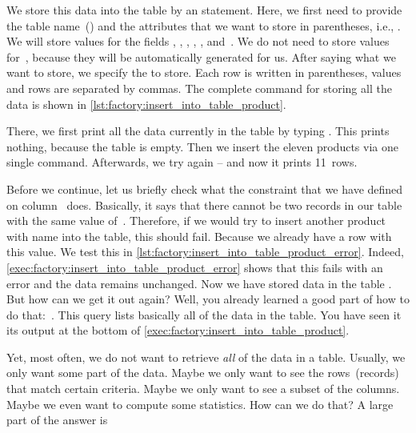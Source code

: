 We store this data into the table  by an  statement.
Here, we first need to provide the table name~() and the attributes that we want to store in parentheses, i.e., .
We will store values for the fields , , , , , and~.
We do not need to store values for~, because they will be automatically generated for us.
After saying what we want to store, we specify the  to store.
Each row is written in parentheses, values and rows are separated by commas.
The complete command for storing all the data is shown in \cref{lst:factory:insert_into_table_product}.

There, we first print all the data currently in the table by typing \sqlIdx{*}.
This prints nothing, because the table is empty.
Then we insert the eleven products via one single  command.
Afterwards, we try \sqlIdx{*} again -- and now it prints 11~rows.

Before we continue, let us briefly check what the  constraint that we have defined on column~ does.
Basically, it says that there cannot be two records in our table with the same value of~.
Therefore, if we would try to insert another product with name  into the table, this should fail.
Because we already have a row with this value.
We test this in \cref{lst:factory:insert_into_table_product_error}.
Indeed, \cref{exec:factory:insert_into_table_product_error} shows that this fails with an error and the data remains unchanged.%
%
\endhsection%
%
%
%
Now we have stored data in the table .
But how can we get it out again?
Well, you already learned a good part of how to do that:~\sqlIdx{*}.
This query lists basically all of the data in the table.
You have seen it its output at the bottom of \cref{exec:factory:insert_into_table_product}.

Yet, most often, we do not want to retrieve \emph{all} of the data in a table.
Usually, we only want some part of the data.
Maybe we only want to see the rows~(records) that match certain criteria.
Maybe we only want to see a subset of the columns.
Maybe we even want to compute some statistics.
How can we do that?
A large part of the answer is 

